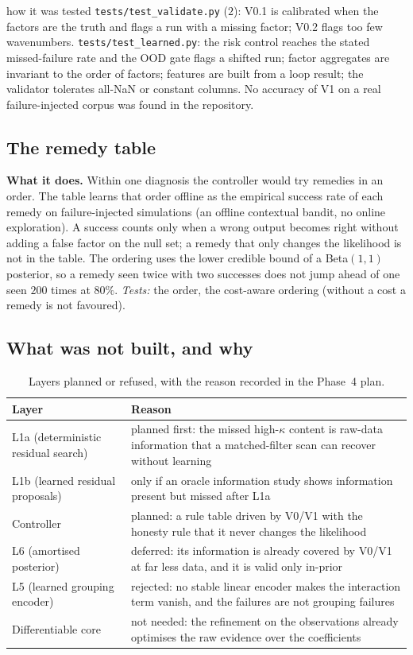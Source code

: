 \begin{explained}{how it was tested}
\texttt{tests/test\_validate.py} ($2$): V0.1 is calibrated when the factors are the truth and flags a run with a missing factor; V0.2 flags too few wavenumbers. \texttt{tests/test\_learned.py}: the risk control reaches the stated missed-failure rate and the OOD gate flags a shifted run; factor aggregates are invariant to the order of factors; features are built from a loop result; the validator tolerates all-NaN or constant columns. No accuracy of V1 on a real failure-injected corpus was found in the repository.
\end{explained}

\subsection{The remedy table}
\textbf{What it does.} Within one diagnosis the controller would try remedies in an order. The table learns that order offline as the empirical success rate of each remedy on failure-injected simulations (an offline contextual bandit, no online exploration). A success counts only when a wrong output becomes right without adding a false factor on the null set; a remedy that only changes the likelihood is not in the table. The ordering uses the lower credible bound of a Beta$(1,1)$ posterior, so a remedy seen twice with two successes does not jump ahead of one seen $200$ times at $80\%$. \emph{Tests:} the order, the cost-aware ordering (without a cost a remedy is not favoured).

\subsection{What was not built, and why}
\begin{table}[!htb]
\centering\small
\begin{tabular}{@{}L{3.0cm}L{9.0cm}@{}}
\toprule
Layer & Reason \\\midrule
L1a (deterministic residual search) & planned first: the missed high-$\kappa$ content is raw-data information that a matched-filter scan can recover without learning\\
L1b (learned residual proposals) & only if an oracle information study shows information present but missed after L1a\\
Controller & planned: a rule table driven by V0/V1 with the honesty rule that it never changes the likelihood\\
L6 (amortised posterior) & deferred: its information is already covered by V0/V1 at far less data, and it is valid only in-prior\\
L5 (learned grouping encoder) & rejected: no stable linear encoder makes the interaction term vanish, and the failures are not grouping failures\\
Differentiable core & not needed: the refinement on the observations already optimises the raw evidence over the coefficients\\
\bottomrule
\end{tabular}
\caption{Layers planned or refused, with the reason recorded in the Phase~4 plan.}
\end{table}

